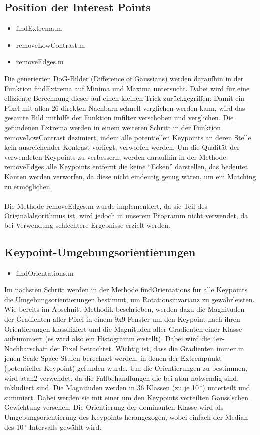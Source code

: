 \documentclass[deutsch]{scrartcl}
\begin{document}
\subsection{Position der Interest Points}
\begin{itemize}
	\item findExtrema.m 
	\item removeLowContrast.m
	\item removeEdges.m
\end{itemize}
Die generierten DoG-Bilder (Difference of
Gaussians) werden daraufhin in der Funktion findExtrema auf Minima und
Maxima untersucht. Dabei wird für eine effiziente Berechnung dieser auf
einen kleinen Trick zurückgegriffen: Damit ein Pixel mit allen 26 direkten
Nachbarn schnell verglichen werden kann, wird das gesamte Bild mithilfe der
Funktion imfilter verschoben und verglichen. Die gefundenen Extrema werden
in einem weiteren Schritt in der Funktion removeLowContrast dezimiert, indem
alle potentiellen Keypoints an deren Stelle kein ausreichender Kontrast
vorliegt, verworfen werden. Um die Qualität der verwendeten Keypoints zu
verbessern, werden daraufhin in der Methode removeEdges alle Keypoints
entfernt die keine "`Ecken"' darstellen, das bedeutet Kanten werden
verworfen, da diese nicht eindeutig genug wären, um ein Matching zu
ermöglichen.\\\\
Die Methode removeEdges.m wurde implementiert, da sie Teil des Originalalgorithmus ist, wird jedoch in unserem Programm nicht verwendet, da bei Verwendung schlechtere Ergebnisse erzielt werden. 

\subsection{Keypoint-Umgebungsorientierungen}
\begin{itemize}
	\item findOrientations.m 
\end{itemize}
Im nächsten Schritt werden in der Methode findOrientations für alle Keypoints die Umgebungsorientierungen bestimmt, um Rotationsinvarianz zu gewährleisten. Wie bereits im Abschnitt Methodik beschrieben, werden dazu die Magnituden der Gradienten aller Pixel in einem 9x9-Fenster um den Keypoint nach ihren Orientierungen klassifiziert und die Magnituden aller Gradienten einer Klasse aufsummiert (es wird also ein Histogramm erstellt). Dabei wird die 4er-Nachbarschaft der Pixel betrachtet. Wichtig ist, dass die Gradienten immer in jenen Scale-Space-Stufen berechnet werden, in denen der Extrempunkt (potentieller Keypoint) gefunden wurde. Um die Orientierungen zu bestimmen, wird atan2 verwendet, da die Fallbehandlungen die bei atan notwendig sind, inkludiert sind. Die Magnituden werden in 36 Klassen (zu je 10$\,^{\circ}$) unterteilt und summiert. Dabei werden sie mit einer um den Keypoints verteilten Gauss'schen Gewichtung versehen. Die Orientierung der dominanten Klasse wird als Umgebungsorientierung des Keypoints herangezogen, wobei einfach der Median des 10$\,^{\circ}$-Intervalls gewählt wird.\cite{lowe04} 
\end{document}
